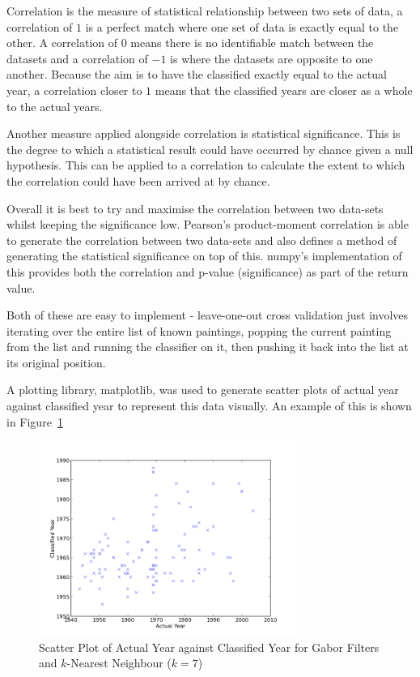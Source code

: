 Correlation is the measure of statistical relationship between two sets of data, a correlation of
$1$ is a perfect match where one set of data is exactly equal to the other. A correlation of $0$
means there is no identifiable match between the datasets and a correlation of $-1$ is where the
datasets are opposite to one another. Because the aim is to have the classified exactly equal to
the actual year, a correlation closer to $1$ means that the classified years are closer as a whole
to the actual years.

Another measure applied alongside correlation is statistical significance. This is the degree to
which a statistical result could have occurred by chance given a null hypothesis. This can be applied
to a correlation to calculate the extent to which the correlation could have been arrived at by 
chance.

Overall it is best to try and maximise the correlation between two data-sets whilst keeping the
significance low. Pearson's product-moment correlation is able to generate the correlation between
two data-sets and also defines a method of generating the statistical significance on top of this.
numpy's implementation of this provides both the correlation and p-value (significance) as part of
the return value.

Both of these are easy to implement - leave-one-out cross validation just involves iterating over
the entire list of known paintings, popping the current painting from the list and running the 
classifier on it, then pushing it back into the list at its original position.

A plotting library, matplotlib, was used to generate scatter plots of actual year against 
classified year to represent this data visually. An example of this is shown in Figure~\ref{fig:scatter}

\begin{figure}[h]
\centering
\includegraphics[width=0.75\textwidth]{img/scatter.png}
\caption{Scatter Plot of Actual Year against Classified Year for Gabor Filters and $k$-Nearest 
Neighbour ($k=7$)}\label{fig:scatter}
\end{figure}

